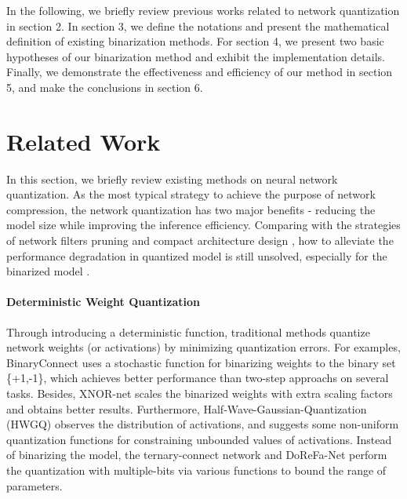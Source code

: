 \documentclass[runningheads]{llncs}
\begin{document}
In the following,
we briefly review previous works related to network quantization in section 2.
In section 3, we define the notations and present the mathematical definition of existing binarization methods.
For section 4, we present two basic hypotheses of our binarization method and exhibit the implementation details.
Finally, we demonstrate the effectiveness and efficiency of our method in section 5,
and make the conclusions in section 6.



\section{Related Work}
In this section, we briefly review existing methods on neural network quantization.
As the most typical strategy to achieve the purpose of network compression,
the network quantization has two major benefits - reducing the model size while improving the inference efficiency.
Comparing with the strategies of network filters pruning \cite{Luo2017ThiNet,he2017channel,liu2017learning}
and compact architecture design \cite{Li2017,cheng2017survey},
how to alleviate the performance degradation in quantized model \cite{hou2019analysis} is still unsolved,
especially for the binarized model \cite{yin2019understanding,alizadeh2019a,binaryop2019}.

\paragraph{\textbf{Deterministic Weight Quantization}}
Through introducing a deterministic function,
traditional methods quantize network weights (or activations) by minimizing quantization errors.
For examples, BinaryConnect \cite{courbariaux2015binaryconnect} uses a stochastic function
for binarizing weights to the binary set \{+1,-1\},
which achieves better performance than two-step approachs \cite{Han2016compress,Kim2016compress} on several tasks.
Besides, XNOR-net \cite{rastegari2016xnor} scales the binarized weights
with extra scaling factors and obtains better results.
Furthermore, Half-Wave-Gaussian-Quantization (HWGQ) \cite{Cai2017Deep}
observes the distribution of activations,
and suggests some non-uniform quantization functions for constraining unbounded values of activations.
Instead of binarizing the model,
the ternary-connect network \cite{Zhu2016Ter} and DoReFa-Net \cite{Zhou2016DoReFa}
perform the quantization with multiple-bits via various functions to bound the range of parameters.
\end{document}
